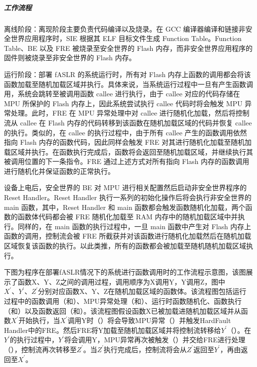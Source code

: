 \documentclass[12pt,a4paper]{ctexart}
\numberwithin{figure}{section}
\begin{document}
\subparagraph{工作流程}
\par 离线阶段：离现阶段主要负责代码编译以及烧录。在 GCC 编译器编译和链接非安全世界应用程序时，SIE 根据其 ELF 目标文件生成 Function Table。Function Table、BE 以及 FRE 被烧录至安全世界的 Flash 内存，而非安全世界应用程序的固件则被烧录至非安全世界的 Flash 内存。
\par 运行阶段：部署 fASLR 的系统运行时，所有对 Flash 内存上函数的调用都会将该函数加载至随机加载区域并执行。具体来说，当系统运行过程中一旦有产生函数调用，系统会跳转至被调用函数 callee 进行执行，由于 callee 对应的代码存储在 MPU 所保护的 Flash 内存上，因此系统尝试执行 callee 代码时将会触发 MPU 异常处理。此时，FRE 在 MPU 异常处理中对 callee 进行随机化加载，然后将控制流从 callee 在 Flash 内存的代码转移到该函数在随机加载区域的代码并恢复 callee 的执行。类似的，在 callee 的执行过程中，由于所有 callee 产生的函数调用依然指向 Flash 内存的函数代码，因此同样会触发 FRE 对其进行随机化加载至随机加载区域并执行。在函数执行完成后，函数将会返回至随机加载区域，并继续执行其被调用位置的下一条指令。FRE 通过上述方式对所有指向 Flash 内存的函数调用进行随机化并保证函数的正常执行。
\par 设备上电后，安全世界的 BE 对 MPU 进行相关配置然后启动非安全世界程序的 Reset Handler。Reset Handler 执行一系列的初始化操作后将会执行非安全世界的 main 函数，其中，Reset Handler 和 main 函数都会触发函数随机化加载，两个函数的函数体代码都会被 FRE 随机化加载至 RAM 内存中的随机加载区域中并执行。同样的，在 main 函数的执行过程中，一旦 main 函数中产生对 Flash 内存上函数的调用，控制流会被 FRE 所截获并对该函数进行随机化加载然后在随机加载区域恢复该函数的执行。以此类推，所有的函数都会被加载至随机随机加载区域执行。
\par 下图为程序在部署fASLR情况下的系统进行函数调用时的工作流程示意图，该图展示了函数X、Y、Z之间的调用过程，调用顺序为X调用Y，Y调用Z，图中$X^{'}、Y^{'}、Z^{'}$分别对应函数X、Y、Z在随机加载区域的函数体。该流程图包括运行过程中的函数调用（和）、MPU异常处理（和）、运行时函数随机化、函数执行（和）以及函数返回（和）。该流程图假设函数X已被加载进随机加载区域并从函数$X^{'}$开始执行，当$X^{'}$调用Y时（）将会导致MPU异常（）并触发HardFault Handler中的FRE。然后FRE将Y加载至随机加载区域并将控制流转移给$Y^{'}$（）。在$Y^{'}$的执行过程中，$Y^{'}$将会调用Y，MPU异常再次被触发（）并交给FRE进行处理（），控制流再次转移至$Z^{'}$。当$Z^{'}$执行完成后，控制流将会从$Z^{'}$返回至$Y^{'}$，再由返回至$X^{'}$。
\end{document}

